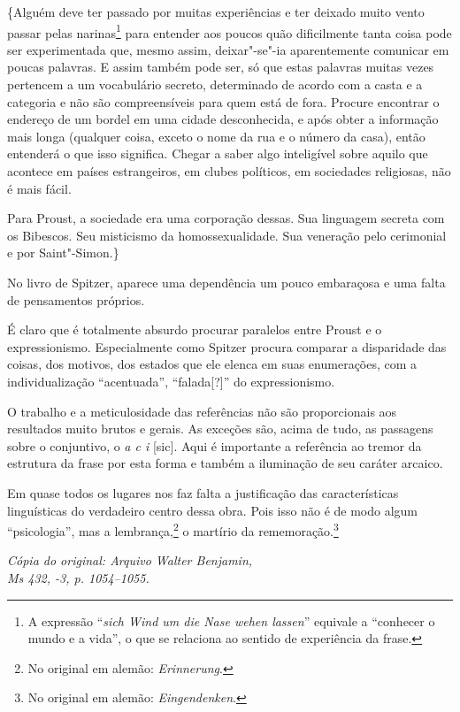 \{Alguém deve ter passado por muitas experiências e ter deixado muito
vento passar pelas narinas\footnote{A expressão ``\emph{sich Wind um die
  Nase wehen lassen}'' equivale a ``conhecer o mundo e a vida'', o que se
  relaciona ao sentido de experiência da frase. \versal{[N.~T.]}} para entender aos
poucos quão dificilmente tanta coisa pode ser experimentada que, mesmo
assim, deixar"-se"-ia aparentemente comunicar em poucas palavras. E assim
também pode ser, só que estas palavras muitas vezes pertencem a um
vocabulário secreto, determinado de acordo com a casta e a categoria e
não são compreensíveis para quem está de fora. Procure encontrar o
endereço de um bordel em uma cidade desconhecida, e após obter a
informação mais longa (qualquer coisa, exceto o nome da rua e o número da
casa), então entenderá o que isso significa. Chegar a saber algo
inteligível sobre aquilo que acontece em países estrangeiros, em clubes
políticos, em sociedades religiosas, não é mais fácil.

Para Proust, a sociedade era uma corporação dessas. Sua linguagem
secreta com os Bibescos. Seu misticismo da homossexualidade. Sua
veneração pelo cerimonial e por Saint"-Simon.\}

No livro de Spitzer, aparece uma dependência um pouco embaraçosa e uma
falta de pensamentos próprios.

É claro que é totalmente absurdo procurar paralelos entre Proust e o
expressionismo. Especialmente como Spitzer procura comparar a disparidade
das coisas, dos motivos, dos estados que ele elenca em suas enumerações,
com a individualização ``acentuada'', ``falada{[}?{]}'' do expressionismo.

O trabalho e a meticulosidade das referências não são proporcionais aos
resultados muito brutos e gerais. As exceções são, acima de tudo, as
passagens sobre o conjuntivo, o \emph{a c i} {[}sic{]}. Aqui é
importante a referência ao tremor da estrutura da frase por esta forma e
também a iluminação de seu caráter arcaico.

Em quase todos os lugares nos faz falta a justificação das
características linguísticas do verdadeiro centro dessa obra. Pois isso
não é de modo algum ``psicologia'', mas a lembrança,\footnote{No
  original em alemão: \emph{Erinnerung}. \versal{[N.~T.]}} o martírio da rememoração.\footnote{No original em alemão: \emph{Eingendenken}. \versal{[N.~T.]}}

\begin{flushright}
\emph{\footnotesize{Cópia do original: Arquivo Walter Benjamin,\\ Ms 432, -3, p. 1054--1055.}}
\end{flushright}

